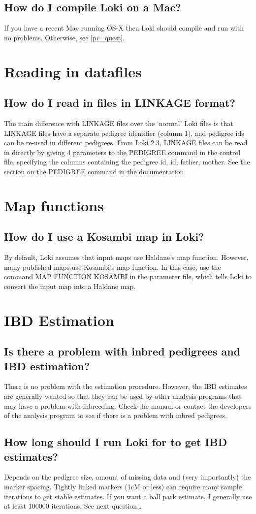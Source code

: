 \documentclass[10pt]{article}
\begin{document}
\subsection{How do I compile Loki on a Mac?}
If you have a recent Mac running OS-X then Loki should compile and run with
no problems.  Otherwise, see \ref{pc_quest}.
\section{Reading in datafiles}
\subsection{How do I read in files in LINKAGE format?}
The main difference with LINKAGE files over the `normal' Loki files is that
LINKAGE files have a separate pedigree identifier (column 1), and pedigree
ids can be re-used in different pedigrees.  From Loki 2.3, LINKAGE files can
be read in directly by giving 4 parameters to the PEDIGREE command in the
control file, specifying the columns containing the pedigree id, id, father,
mother.  See the section on the PEDIGREE command in the documentation.
\section{Map functions}
\subsection{How do I use a Kosambi map in Loki?}
By default, Loki assumes that input maps use Haldane's map function.
However, many published maps use Kosambi's map function.  In this case, use
the command MAP FUNCTION KOSAMBI in the parameter file, which tells Loki to
convert the input map into a Haldane map.
\section{IBD Estimation}
\subsection{Is there a problem with inbred pedigrees and IBD estimation?}
There is no problem with the estimation procedure.  However, the IBD
estimates are generally wanted so that they can be used by other analysis
programs that may have a problem with inbreeding.  Check the manual or
contact the developers of the analysis program to see if there is a problem
with inbred pedigrees.
\subsection{How long should I run Loki for to get IBD estimates?}
Depends on the pedigree size, amount of missing data and (very importantly)
the marker spacing.  Tightly linked markers (1cM or less) can require many
sample iterations to get stable estimates.  If you want a ball park
estimate, I generally use at least 100000 iterations.  See next question{\ldots} 
\end{document}
